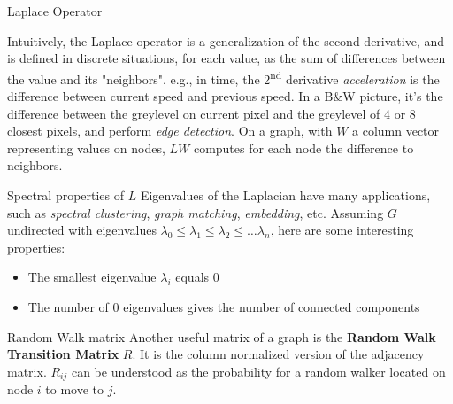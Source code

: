 \documentclass[a4paper,11pt]{book}
\begin{document}
\begin{textbox}{Laplace Operator}

Intuitively, the Laplace operator is a generalization of the second derivative, and is defined in discrete situations, for each value, as the sum of differences between the value and its "neighbors". e.g., in time, the 2\textsuperscript{nd} derivative \textit{acceleration} is the difference between current speed and previous speed. In a B\&W picture, it's the difference between the greylevel on current pixel and the greylevel of 4 or 8 closest pixels, and perform \textit{edge detection}. On a graph, with $W$ a column vector representing values on nodes, $LW$ computes for each node the difference to neighbors. 
\end{textbox}




\begin{textbox}{Spectral properties of $L$}
Eigenvalues of the Laplacian have many applications, such as \textit{spectral clustering}, \textit{graph matching}, \textit{embedding}, etc. Assuming $G$ undirected with eigenvalues $\lambda_0 \leq \lambda_1 \leq \lambda_2 \leq \dots \lambda_n$, here are some interesting properties:

\begin{itemize}
    \item The smallest eigenvalue $\lambda_i$ equals 0
    \item The number of 0 eigenvalues gives the number of connected components
\end{itemize}

\end{textbox}


\begin{textbox}{Random Walk matrix}
Another useful matrix of a graph is the \textbf{Random Walk Transition Matrix} $R$. It is the column normalized version of the adjacency matrix. $R_{ij}$ can be understood as the probability for a random walker located on node $i$ to move to $j$.

\end{textbox}
\end{document}
